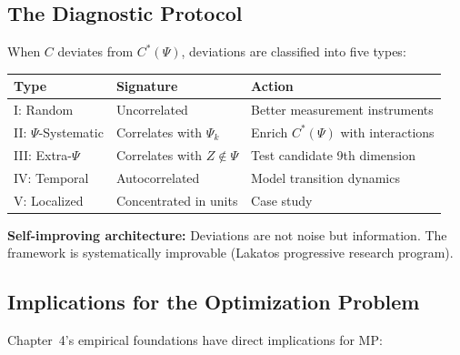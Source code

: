 \subsection{The Diagnostic Protocol}

When $C$ deviates from $C^*(\Psi)$, deviations are classified into five types:

\begin{center}
\small
\renewcommand{\arraystretch}{1.2}
\begin{tabular}{@{}llp{5cm}@{}}
\toprule
\textbf{Type} & \textbf{Signature} & \textbf{Action} \\
\midrule
I: Random & Uncorrelated & Better measurement instruments \\
II: $\Psi$-Systematic & Correlates with $\Psi_k$ & Enrich $C^*(\Psi)$ with interactions \\
III: Extra-$\Psi$ & Correlates with $Z \notin \Psi$ & Test candidate 9th dimension \\
IV: Temporal & Autocorrelated & Model transition dynamics \\
V: Localized & Concentrated in units & Case study \\
\bottomrule
\end{tabular}
\end{center}

\textbf{Self-improving architecture:} Deviations are not noise but information.
The framework is systematically improvable (Lakatos progressive research program).

\subsection{Implications for the Optimization Problem}

Chapter~4's empirical foundations have direct implications for MP:

